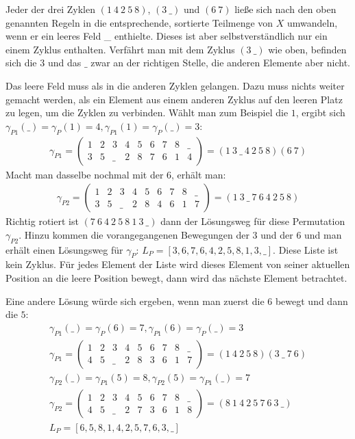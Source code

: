 \documentclass{fh-ium-bama}
\begin{document}
Jeder der drei Zyklen $(1~4~2~5~8)$, $(3~\_)$ und $(6~7)$ ließe sich nach den oben genannten Regeln in die entsprechende, sortierte Teilmenge von $X$ umwandeln, wenn er ein leeres Feld \_ enthielte. Dieses ist aber selbstverständlich nur ein einem Zyklus enthalten. Verfährt man mit dem Zyklus $(3~\_)$ wie oben, befinden sich die $3$ und das $\_$ zwar an der richtigen Stelle, die anderen Elemente aber nicht.

Das leere Feld muss als in die anderen Zyklen gelangen. Dazu muss nichts weiter gemacht werden, als ein Element aus einem anderen Zyklus auf den leeren Platz zu legen, um die Zyklen zu verbinden. Wählt man zum Beispiel die $1$, ergibt sich $\gamma_{P1}(\_) = \gamma_P(1) = 4, \gamma_{P1}(1) = \gamma_P(\_) = 3$:
\begin{gather*}
\gamma_{P1} = \begin{pmatrix}
	1 & 2 & 3 & 4 & 5 & 6 & 7 & 8 & \_ \\
	3 & 5 & \_ & 2 & 8 & 7 & 6 & 1 & 4
\end{pmatrix} =
(1 ~ 3 ~ \_ ~ 4 ~ 2 ~ 5 ~ 8)(6 ~ 7)
\end{gather*}
Macht man dasselbe nochmal mit der $6$, erhält man:
\begin{gather*}
\gamma_{P2} = \begin{pmatrix}
	1 & 2 & 3 & 4 & 5 & 6 & 7 & 8 & \_ \\
	3 & 5 & \_ & 2 & 8 & 4 & 6 & 1 & 7
\end{pmatrix} =
(1 ~ 3 ~ \_ ~ 7 ~ 6 ~ 4 ~ 2 ~ 5 ~ 8) 
\end{gather*}
Richtig rotiert ist $(7 ~ 6 ~ 4 ~ 2 ~ 5 ~ 8 ~ 1 ~ 3 ~ \_)$ dann der Lösungsweg für diese Permutation $\gamma_{P2}$. Hinzu kommen die vorangegangenen Bewegungen der $3$ und der $6$ und man erhält einen Lösungsweg für $\gamma_P$: $L_P = [3, 6, 7, 6, 4, 2, 5, 8, 1, 3, \_]$. Diese Liste ist kein Zyklus. Für jedes Element der Liste wird dieses Element von seiner aktuellen Position an die leere Position bewegt, dann wird das nächste Element betrachtet.

Eine andere Lösung würde sich ergeben, wenn man zuerst die $6$ bewegt und dann die $5$:
\begin{gather*}
\gamma_{P1}(\_) = \gamma_P(6) = 7, \gamma_{P1}(6) = \gamma_P(\_) = 3\\
\gamma_{P1} = \begin{pmatrix}
	1 & 2 & 3 & 4 & 5 & 6 & 7 & 8 & \_ \\
	4 & 5 & \_ & 2 & 8 & 3 & 6 & 1 & 7
\end{pmatrix} =
(1 ~ 4 ~ 2 ~ 5 ~ 8)(3 ~ \_ ~ 7 ~ 6)\\
\gamma_{P2}(\_) = \gamma_{P1}(5) = 8, \gamma_{P2}(5) = \gamma_{P1}(\_) = 7\\
\gamma_{P2} = \begin{pmatrix}
	1 & 2 & 3 & 4 & 5 & 6 & 7 & 8 & \_ \\
	4 & 5 & \_ & 2 & 7 & 3 & 6 & 1 & 8
\end{pmatrix} =
(8 ~ 1 ~ 4 ~ 2 ~ 5 ~ 7 ~ 6 ~ 3 ~ \_)\\
L_P = [6, 5, 8, 1, 4, 2, 5, 7, 6, 3, \_]
\end{gather*}
\end{document}
